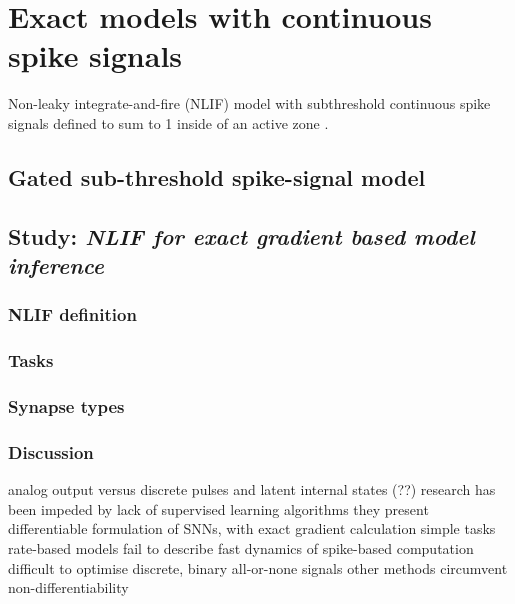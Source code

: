 \documentclass[mphil,deptreport,ai]{infthesis} %
\begin{document}
\chapter{Exact models with continuous spike signals}

Non-leaky integrate-and-fire (NLIF) model with subthreshold continuous spike signals defined to sum to 1 inside of an active zone \cite{Huh2017}.

\section{Gated sub-threshold spike-signal model}

\section{Study: \textit{NLIF for exact gradient based model inference}}

\subsection{NLIF definition}

\subsection{Tasks}

\subsection{Synapse types}

\subsection{Discussion}

analog output versus discrete pulses and latent internal states (??)
research has been impeded by lack of supervised learning algorithms
they present differentiable formulation of SNNs, with exact gradient calculation
simple tasks
rate-based models fail to describe fast dynamics of spike-based computation
difficult to optimise discrete, binary all-or-none signals
other methods circumvent non-differentiability
\end{document}
